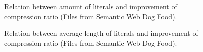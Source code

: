 \documentclass[a4paper]{scrartcl}
\begin{document}
\begin{figure}[h]
	\centering
	\hfill
	\caption{Relation between amount of literals and improvement of compression ratio (Files from Semantic Web Dog Food).}
\end{figure}

\begin{figure}[h]
	\centering
	\hfill
	\caption{Relation between average length of literals and improvement of compression ratio (Files from Semantic Web Dog Food).}
\end{figure}
\end{document}
